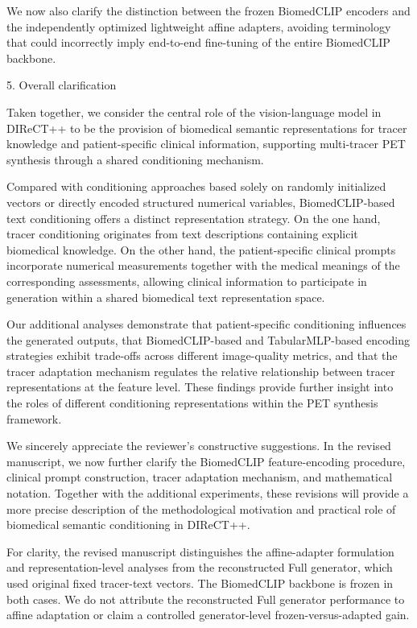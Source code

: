 {We now also clarify the distinction between the frozen BiomedCLIP encoders and the independently optimized lightweight affine adapters, avoiding terminology that could incorrectly imply end-to-end fine-tuning of the entire BiomedCLIP backbone.

5. Overall clarification

Taken together, we consider the central role of the vision-language model in DIReCT++ to be the provision of biomedical semantic representations for tracer knowledge and patient-specific clinical information, supporting multi-tracer PET synthesis through a shared conditioning mechanism.

Compared with conditioning approaches based solely on randomly initialized vectors or directly encoded structured numerical variables, BiomedCLIP-based text conditioning offers a distinct representation strategy. On the one hand, tracer conditioning originates from text descriptions containing explicit biomedical knowledge. On the other hand, the patient-specific clinical prompts incorporate numerical measurements together with the medical meanings of the corresponding assessments, allowing clinical information to participate in generation within a shared biomedical text representation space.

Our additional analyses demonstrate that patient-specific conditioning influences the generated outputs, that BiomedCLIP-based and TabularMLP-based encoding strategies exhibit trade-offs across different image-quality metrics, and that the tracer adaptation mechanism regulates the relative relationship between tracer representations at the feature level. These findings provide further insight into the roles of different conditioning representations within the PET synthesis framework.

We sincerely appreciate the reviewer’s constructive suggestions. In the revised manuscript, we now further clarify the BiomedCLIP feature-encoding procedure, clinical prompt construction, tracer adaptation mechanism, and mathematical notation. Together with the additional experiments, these revisions will provide a more precise description of the methodological motivation and practical role of biomedical semantic conditioning in DIReCT++.

For clarity, the revised manuscript distinguishes the affine-adapter formulation and representation-level analyses from the reconstructed Full generator, which used original fixed tracer-text vectors. The BiomedCLIP backbone is frozen in both cases. We do not attribute the reconstructed Full generator performance to affine adaptation or claim a controlled generator-level frozen-versus-adapted gain.}

